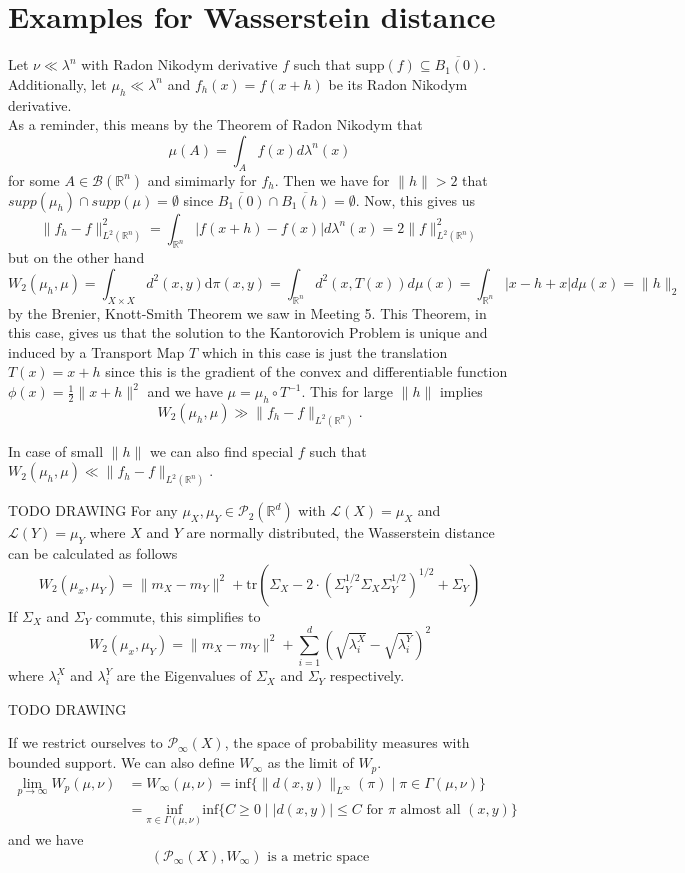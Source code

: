 \documentclass[15pt]{article}
\newcommand{\R}{\mathbb{R}}
\begin{document}
\section*{Examples for Wasserstein distance}
Let $\nu \ll \lambda^n$ with Radon Nikodym derivative $f$ such that $\text{supp}(f) \subseteq \overline{B_1(0)}$. \\ 
Additionally, let $\mu_h \ll \lambda^n$ and $f_h(x) = f(x+h)$ be its Radon Nikodym derivative. \\
As a reminder, this means by the Theorem of Radon Nikodym that $$\mu(A) = \int_{A} f(x) d\lambda^n(x)$$ for some $A \in \mathcal{B}(\R^n)$ and simimarly for $f_h$. 
Then we have for $\|h\| > 2$ that $supp(\mu_h) \cap supp(\mu) = \emptyset$ since $\overline{B_1(0)} \cap \overline{B_1(h)} = \emptyset$. Now, this gives us 
$$\|f_h-f\|^2_{L^2(\mathbb{R}^n)} = \int_{\mathbb{R}^n} |f(x+h)-f(x)| d\lambda^n(x) =2\|f\|_{L^2(\mathbb{R}^n)}^2 $$
but on the other hand $$W_2(\mu_h,\mu) = \int_{X\times X}d^2(x,y)\mathrm{d}\pi(x,y) = \int_{\R^n} d^2(x,T(x))  d\mu(x) = \int_{\R^n} |x-h+x| d\mu(x) = \|h\|_2$$ by the Brenier, Knott-Smith Theorem we saw in Meeting 5. 
This Theorem, in this case, gives us that the solution to the Kantorovich Problem is unique and induced by a Transport Map $T$ which in this case is just the translation $T(x) = x+h$ since this is the gradient of the convex and differentiable function $\phi(x) = \frac{1}{2}\|x+h\|^2$ and we have $\mu = \mu_h \circ T^{-1}$. This for large $\|h\|$ implies $$W_2(\mu_h,\mu) \gg \|f_h-f\|_{L^2(\mathbb{R}^n)}.$$ 

In case of small $\|h\|$ we can also find special $f$ such that $W_2(\mu_h,\mu) \ll \|f_h-f\|_{L^2(\mathbb{R}^n)}$. 

\bigbreak
TODO DRAWING
\bigbreak
For any $\mu_X,\mu_Y \in \mathcal{P}_2(\mathbb{R}^d)$ with $\mathcal{L}(X) = \mu_X$ and $\mathcal{L}(Y) = \mu_Y$ where $X$ and $Y$ are normally distributed, 
    the Wasserstein distance can be calculated as follows $$W_2(\mu_x,\mu_Y) = \|m_X-m_Y\|^2 + \text{tr}\left(\Sigma_X-2 \cdot \left(\Sigma_Y^{1/2}\Sigma_X\Sigma_Y^{1/2}\right)^{1/2}+\Sigma_Y\right)$$
    If $\Sigma_X$ and $\Sigma_Y$ commute, this simplifies to $$W_2(\mu_x,\mu_Y) = \|m_X-m_Y\|^2 + \sum_{i = 1}^d \left( \sqrt{\lambda_i^X} - \sqrt{\lambda_i^Y}  \right)^2$$
    where $\lambda_i^X$ and $\lambda_i^Y$ are the Eigenvalues of $\Sigma_X$ and $\Sigma_Y$ respectively. 

\bigbreak
TODO DRAWING


If we restrict ourselves to $\mathcal{P}_\infty(X)$, the space of probability measures with bounded support. We can also define $W_\infty$ as the limit of $W_p$.
\begin{align*}\lim_{p \to \infty} W_p(\mu,\nu) &= W_\infty(\mu,\nu) =\text{inf}\{\|d(x,y)\|_{L^\infty}(\pi) \mid \pi \in \Gamma(\mu,\nu)\} \\
&= \underset{\pi \in \Gamma(\mu,\nu)}{\text{inf}}\text{inf}\{C \geq 0 \mid |d(x,y)| \leq C \text{ for } \pi \text{ almost all } (x,y)\} \end{align*} 
and we have $$(\mathcal{P}_\infty(X), W_\infty) \text{ is a metric space}$$
\newpage 
\end{document}
